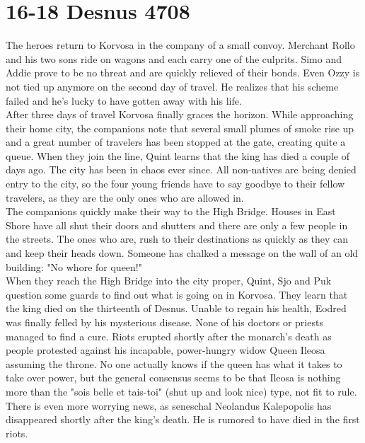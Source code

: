 \section{16-18 Desnus 4708}

The heroes return to Korvosa in the company of a small convoy. Merchant Rollo and his two sons ride on wagons and each carry one of the culprits. Simo and Addie prove to be no threat and are quickly relieved of their bonds. Even Ozzy is not tied up anymore on the second day of travel. He realizes that his scheme failed and he's lucky to have gotten away with his life.\\

After three days of travel Korvosa finally graces the horizon. While approaching their home city, the companions note that several small plumes of smoke rise up and a great number of travelers has been stopped at the gate, creating quite a queue. When they join the line, Quint learns that the king has died a couple of days ago. The city has been in chaos ever since. All non-natives are being denied entry to the city, so the four young friends have to say goodbye to their fellow travelers, as they are the only ones who are allowed in.\\

The companions quickly make their way to the High Bridge. Houses in East Shore have all shut their doors and shutters and there are only a few people in the streets. The ones who are, rush to their destinations as quickly as they can and keep their heads down. Someone has chalked a message on the wall of an old building: "No whore for queen!"\\

When they reach the High Bridge into the city proper, Quint, Sjo and Puk question some guards to find out what is going on in Korvosa. They learn that the king died on the thirteenth of Desnus. Unable to regain his health, Eodred was finally felled by his mysterious disease. None of his doctors or priests managed to find a cure. Riots erupted shortly after the monarch's death as people protested against his incapable, power-hungry widow Queen Ileosa assuming the throne. No one actually knows if the queen has what it takes to take over power, but the general consensus seems to be that Ileosa is nothing more than the "sois belle et tais-toi" (shut up and look nice) type, not fit to rule. There is even more worrying news, as seneschal Neolandus Kalepopolis has disappeared shortly after the king's death. He is rumored to have died in the first riots.\\

